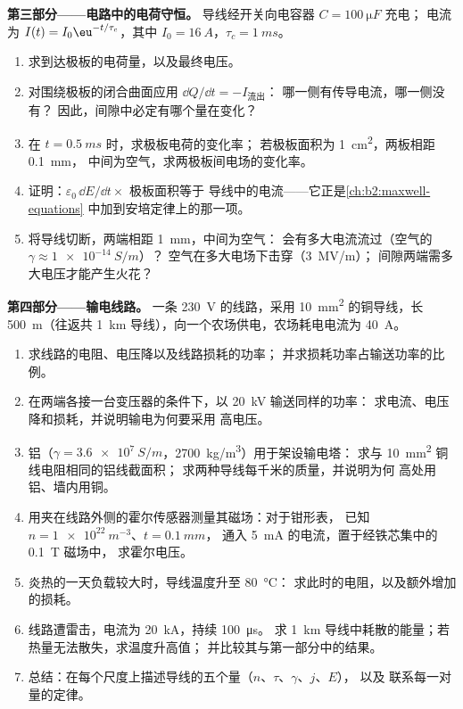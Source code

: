 \begin{problem}
\medskip
\noindent\textbf{第三部分——电路中的电荷守恒。}
导线经开关向电容器 $C = \qty{100}{\micro F}$ 充电；
电流为 $I(t) = I_0\eu^{-t/\tau_c}$，其中 $I_0 = \qty{16}{A}$，$\tau_c = \qty{1}{ms}$。
\begin{enumerate}[resume]
  \item 求到达极板的电荷量，以及最终电压。
  \item 对围绕极板的闭合曲面应用 $\dd Q/\dd t = -I_{\text{流出}}$：
        哪一侧有传导电流，哪一侧没有？
        因此，间隙中必定有哪个量在变化？
  \item 在 $t = \qty{0.5}{ms}$ 时，求极板电荷的变化率；
        若极板面积为 \qty{1}{cm^2}，两板相距 \qty{0.1}{mm}，
        中间为空气，求两极板间电场的变化率。
  \item 证明：$\varepsilon_0\,\dd E/\dd t \times$ 极板面积等于
        导线中的电流——它正是\cref{ch:b2:maxwell-equations}
        中加到安培定律上的那一项。
  \item 将导线切断，两端相距 \qty{1}{mm}，中间为空气：
        会有多大电流流过（空气的 $\gamma \approx \qty{1e-14}{S/m}$）？
        空气在多大电场下击穿（\qty{3}{MV/m}）；
        间隙两端需多大电压才能产生火花？
\end{enumerate}

\medskip
\noindent\textbf{第四部分——输电线路。}
一条 \qty{230}{V} 的线路，采用 \qty{10}{mm^2} 的铜导线，长 \qty{500}{m}（往返共
\qty{1}{km} 导线），向一个农场供电，农场耗电电流为 \qty{40}{A}。
\begin{enumerate}[resume]
  \item 求线路的电阻、电压降以及线路损耗的功率；
        并求损耗功率占输送功率的比例。
  \item 在两端各接一台变压器的条件下，以 \qty{20}{kV} 输送同样的功率：
        求电流、电压降和损耗，并说明输电为何要采用
        高电压。
  \item 铝（$\gamma = \qty{3.6e7}{S/m}$，\qty{2700}{kg/m^3}）用于架设输电塔：
        求与 \qty{10}{mm^2} 铜线电阻相同的铝线截面积；
        求两种导线每千米的质量，并说明为何
        高处用铝、墙内用铜。
  \item 用夹在线路外侧的霍尔传感器测量其磁场：对于钳形表，
        已知 $n = \qty{1e22}{m^{-3}}$、$t = \qty{0.1}{mm}$，
        通入 \qty{5}{mA} 的电流，置于经铁芯集中的 \qty{0.1}{T} 磁场中，
        求霍尔电压。
  \item 炎热的一天负载较大时，导线温度升至 \qty{80}{\degreeCelsius}：
        求此时的电阻，以及额外增加的损耗。
  \item 线路遭雷击，电流为 \qty{20}{kA}，持续 \qty{100}{\micro s}。
        求 \qty{1}{km} 导线中耗散的能量；若热量无法散失，求温度升高值；
        并比较其与第一部分中的结果。
  \item 总结：在每个尺度上描述导线的五个量（$n$、$\tau$、$\gamma$、$j$、$E$），
        以及
        联系每一对量的定律。
\end{enumerate}
\end{problem}
